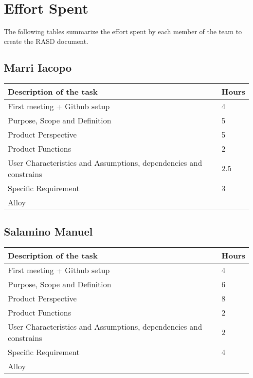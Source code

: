 \section{Effort Spent}
The following tables summarize the effort spent by each member of the team to create the RASD document.
\subsection{Marri Iacopo}
\begin{center}
\renewcommand{\arraystretch}{1.5}
\begin{tabular}{ |m{7cm}|m{2cm}| } 
 \hline
 \textbf{Description of the task}  & \textbf{Hours} \\
 \hline
 First meeting + Github setup & 4 \\
 \hline
 Purpose, Scope and Definition & 5 \\
 \hline
 Product Perspective & 5 \\ 
 \hline
 Product Functions & 2 \\ 
 \hline 
 User Characteristics and Assumptions, dependencies and constrains & 2.5 \\ 
 \hline
 Specific Requirement & 3 \\
 \hline
 Alloy & \\
 \hline
\end{tabular}
\end{center}


\subsection{Salamino Manuel}
\renewcommand{\arraystretch}{1.5}

\begin{center}
\begin{tabular}{ |m{7cm}|m{2cm}| } 
 \hline
 \textbf{Description of the task}  & \textbf{Hours} \\
 \hline
 First meeting + Github setup & 4\\
 \hline
 Purpose, Scope and Definition & 6 \\
 \hline
 Product Perspective & 8 \\ 
 \hline
 Product Functions & 2 \\ 
 \hline 
 User Characteristics and Assumptions, dependencies and constrains & 2 \\ 
 \hline
 Specific Requirement & 4 \\
 \hline
 Alloy & \\
 \hline
\end{tabular}
\end{center}

